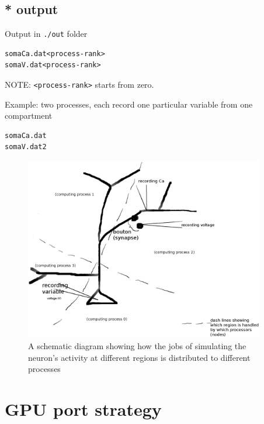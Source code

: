 \subsection{* output}

Output in \verb!./out! folder
\begin{verbatim}
somaCa.dat<process-rank>
somaV.dat<process-rank>
\end{verbatim}
NOTE: \verb!<process-rank>! starts from zero. 

Example: two processes, each record one particular variable from one compartment 
\begin{verbatim}
somaCa.dat
somaV.dat2
\end{verbatim}



\begin{figure}[hbt]
  \centerline{
  \includegraphics[height=8cm,
    angle=0]{./images/NTS_job-distribution-concept.eps}}
\caption{A schematic diagram showing how the jobs of simulating the neuron's
activity at different regions is distributed to different processes}
\label{fig:NTS_job-distribution-concept}
\end{figure}

\section{GPU port strategy}


